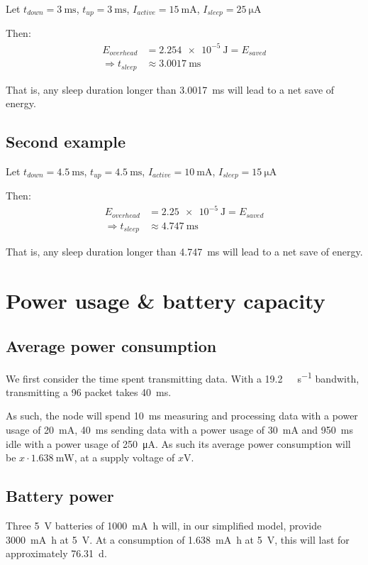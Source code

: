 \documentclass[a4paper]{scrreprt}
\begin{document}
Let $t_{down} = \SI{3}{\ms}$, $t_{up} = \SI{3}{\ms}$, $I_{active} = \SI{15}{\mA}$, $I_{sleep} = \SI{25}{\uA}$

Then:
\begin{align*}
		E_{overhead} & = \SI{2.254e-5}{\J} = E_{saved} \\
		\Rightarrow t_{sleep} & \approx \SI{3.0017}{\ms}
\end{align*}

That is, any sleep duration longer than \SI{3.0017}{\ms} will lead to a net
save of energy.

\subsection{Second example}

Let $t_{down} = \SI{4.5}{\ms}$, $t_{up} = \SI{4.5}{\ms}$, $I_{active} = \SI{10}{\mA}$, $I_{sleep} = \SI{15}{\uA}$

Then:
\begin{align*}
		E_{overhead} & = \SI{2.25e-5}{\J} = E_{saved} \\
		\Rightarrow t_{sleep} & \approx \SI{4.747}{\ms}
\end{align*}

That is, any sleep duration longer than \SI{4.747}{\ms} will lead to a net
save of energy.

\section{Power usage \& battery capacity}

\subsection{Average power consumption}

We first consider the time spent transmitting data. With a
\SI{19.2}{\kilo\bit\per\second} bandwith, transmitting a \SI{96}{\byte} packet
takes \SI{40}{\ms}.

As such, the node will spend \SI{10}{\ms} measuring and processing data with a
power usage of \SI{20}{\mA}, \SI{40}{\ms} sending data with a power usage of
\SI{30}{\mA} and \SI{950}{\ms} idle with a power usage of \SI{250}{\uA}. As
such its average power consumption will be $x \cdot \SI{1.638}{\mW}$, at a
supply voltage of $x \si{\V}$.

\subsection{Battery power}

Three \SI{5}{\V} batteries of \SI{1000}{\milli\ampere\hour} will, in our
simplified model, provide \SI{3000}{\milli\ampere\hour} at \SI{5}{\V}. At a
consumption of \SI{1.638}{\milli\ampere\hour} at \SI{5}{\V}, this will last for
approximately \SI{76.31}{\day}.
\end{document}
